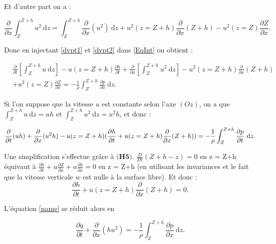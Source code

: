 \documentclass[
11pt, %
francais, %
singlespacing, %
headsepline, %
f%
]{MastersDoctoralThesis} %
\theoremstyle{definition}
\begin{document}
Et d'autre part on a :

\begin{equation}
\frac{\partial}{\partial x}\int_{Z}^{Z+h}u^{2} ~\mathrm dz = \int_{Z}^{Z+h}\frac{\partial }{\partial x}(u^{2}) ~\mathrm dz +u^{2}(z=Z+h)\frac{\partial}{\partial x}(Z+h)-u^{2}(z=Z)\frac{\partial Z}{\partial x}. \label{dvpt2}
\end{equation}

Donc en injectant \eqref{dvpt1} et \eqref{dvpt2} dans \eqref{EqInt} on obtient :

\begin{equation}
\begin{split}
& \frac{\partial}{\partial t}\left[\int_{Z}^{Z+h}u ~\mathrm dz\right] -u(z=Z+h)\frac{\partial h}{\partial t} + \frac{\partial}{\partial x}\left[\int_{Z}^{Z+h} u^{2} ~\mathrm dz\right]-u^{2}(z=Z+h)\frac{\partial}{\partial x}(Z+h) \\
& +u^{2}(z=Z)\frac{\partial Z}{\partial x}= -\frac{1}{\rho}\int_{Z}^{Z+h}\frac{\partial p}{\partial x} ~\mathrm dz.
\end{split}
\end{equation}


Si l'on suppose que la vitesse $u$ est constante selon l'axe $(Oz)$, on a que $\int_{Z}^{Z+h}u ~\mathrm dz = uh$ et $\int_{Z}^{Z+h}u^{2} ~\mathrm dz = u^{2}h$, et donc :

\begin{equation}
 \frac{\partial}{\partial t}(uh)+ \frac{\partial}{\partial x}(u^{2}h)-u(z=Z+h)(\frac{\partial h}{\partial t}+u(z=Z+h)\frac{\partial}{\partial x}(Z+h)) \\
 =-\frac{1}{\rho}\int_{Z}^{Z+h}\frac{\partial p}{\partial t} ~\mathrm dz. \label{name}
\end{equation}

Une simplification s'effectue grâce à $\textbf{(H5)}$.  $\frac{D}{Dt} (Z+h-z) = 0$ en z = Z+h équivaut à $\frac{\partial h}{\partial t}+u\frac{\partial Z}{\partial x}+u\frac{\partial h}{\partial x}=0$ en z = Z+h (en utilisant les invariances et le fait que la vitesse verticale $w$ est nulle à la surface libre). Et donc : $$\frac{\partial h}{\partial t}+u(z=Z+h)\frac{\partial}{\partial x}(Z+h)=0.$$

L'équation \ref{name} se réduit alors en

\begin{equation}
 \frac{\partial q}{\partial t}+ \frac{\partial}{\partial x}(hu^{2})=-\frac{1}{\rho}\int_{Z}^{Z+h}\frac{\partial p}{\partial x} ~\mathrm dz. \label{brice2}
 \end{equation}
\end{document}
